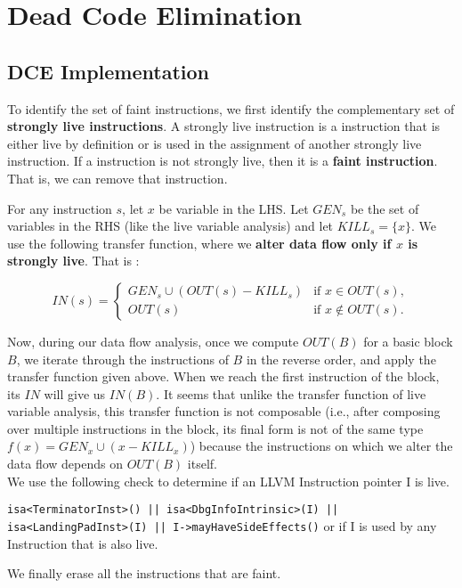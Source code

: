 \section{Dead Code Elimination}

\subsection{DCE Implementation}

To identify the set of faint instructions, we first identify the complementary set of \textbf{strongly live instructions}.
A strongly live instruction is a instruction that is either live by definition or is used in the assignment of another
strongly live instruction.
If a instruction is not strongly live, then it is a \textbf{faint instruction}.
That is, we can remove that instruction.

For any instruction $s$, let $x$ be variable in the LHS. Let $GEN_s$ be the set of variables in the RHS (like the live variable analysis) and
let $KILL_s = \{x\}$. We use the following transfer function, where we \textbf{alter data flow only if $x$ is strongly live}. That is :

\[
IN(s) = \left\{ 
\begin{array}{ll}
GEN_s \cup (OUT(s)-KILL_s) & \mbox{if } x \in OUT(s),\\
OUT(s) & \mbox{if } x \notin OUT(s).
\end{array}
\right.
\]

Now, during our data flow analysis, once we compute $OUT(B)$ for a basic block $B$, we iterate through the instructions of $B$ in the reverse order, and apply the transfer function given above. When we reach the first instruction of the block, its $IN$ will give us $IN(B)$. It seems that unlike the transfer function of live variable analysis, this transfer function is not composable (i.e., after composing over multiple instructions in the block, its final form is not of the same type $f(x) = GEN_x \cup (x-KILL_x)$) because the instructions on which we alter the data flow depends on $OUT(B)$ itself.\\  

We use the following check to determine if an LLVM Instruction pointer I is live.

\texttt{isa<TerminatorInst>() || isa<DbgInfoIntrinsic>(I) || \\  isa<LandingPadInst>(I) || I->mayHaveSideEffects()} or if I is used by any Instruction that is also live. 

We finally erase all the instructions that are faint.

